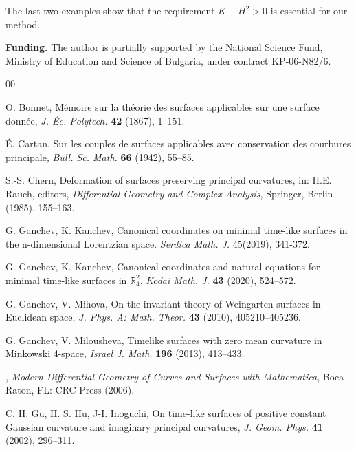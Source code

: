 \documentclass[12pt]{amsart}
\theoremstyle{definition}
\theoremstyle{remark}
\begin{document}
The last two examples show that 
the requirement $K-H^2>0$ is essential for our method.






{\bf Funding.} The author is partially supported by the National Science Fund, Ministry of Education and Science of Bulgaria, 
under contract KP-06-N82/6.

 
\vspace{1cm}


\begin{thebibliography}{00}



 {\sc O. Bonnet}, M\'emoire sur la th\'eorie des surfaces applicables sur une surface donn\'ee, 
{\it J. \'Ec. Polytech.} {\bf 42} (1867), 1--151.

 {\sc  \'E. Cartan}, Sur les couples de surfaces applicables avec conservation des courbures principale, 
{\it Bull. Sc. Math. } {\bf 66} (1942),  55--85.

 {\sc  S.-S. Chern}, Deformation of surfaces preserving principal curvatures, 
in: H.E. Rauch, editors, {\em Differential Geometry and Complex Analysis}, 
Springer, Berlin (1985), 155--163.

 {\sc G. Ganchev,  K. Kanchev}, Canonical coordinates on minimal time-like surfaces
in the n-dimensional Lorentzian space. {\it Serdica Math. J.} 45(2019), 341-372.

 {\sc G. Ganchev,  K. Kanchev}, Canonical coordinates and natural equations 
for minimal time-like surfaces in $\mathbb R_4^2$, 
{\it Kodai Math. J. } {\bf 43} (2020), 524--572.

 {\sc G. Ganchev, V. Mihova}, On the invariant theory of Weingarten surfaces in
Euclidean space, 
{\it J. Phys. A: Math. Theor. } {\bf 43} (2010),  405210--405236.

 {\sc G. Ganchev, V. Milousheva}, Timelike surfaces with zero mean curvature in Minkowski 4-space, 
{\it Israel J. Math. } {\bf 196} (2013),  413--433.



, {\it Modern Differential Geometry of Curves and Surfaces 
with Mathematica}, Boca Raton, FL: CRC Press (2006).


 {\sc C. H. Gu, H. S. Hu, J-I. Inoguchi}, On time-like surfaces of positive constant Gaussian
curvature and imaginary principal curvatures, {\it J. Geom. Phys.} {\bf 41} (2002), 296--311.


\end{thebibliography}
\end{document}
